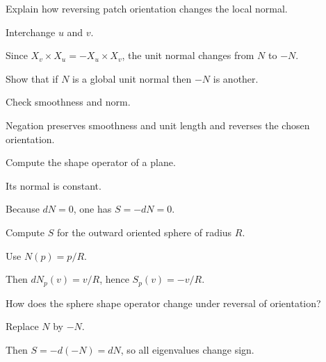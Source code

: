 \begin{exercise}\label{exr:vii16-03}
Explain how reversing patch orientation changes the local normal.
\end{exercise}
\begin{hint}
Interchange \(u\) and \(v\).
\end{hint}
\begin{solution}
Since \(X_v\times X_u=-X_u\times X_v\), the unit normal changes from \(N\) to \(-N\).
\end{solution}

\begin{exercise}\label{exr:vii16-04}
Show that if \(N\) is a global unit normal then \(-N\) is another.
\end{exercise}
\begin{hint}
Check smoothness and norm.
\end{hint}
\begin{solution}
Negation preserves smoothness and unit length and reverses the chosen orientation.
\end{solution}

\begin{exercise}\label{exr:vii16-05}
Compute the shape operator of a plane.
\end{exercise}
\begin{hint}
Its normal is constant.
\end{hint}
\begin{solution}
Because \(dN=0\), one has \(S=-dN=0\).
\end{solution}

\begin{exercise}\label{exr:vii16-06}
Compute \(S\) for the outward oriented sphere of radius \(R\).
\end{exercise}
\begin{hint}
Use \(N(p)=p/R\).
\end{hint}
\begin{solution}
Then \(dN_p(v)=v/R\), hence \(S_p(v)=-v/R\).
\end{solution}

\begin{exercise}\label{exr:vii16-07}
How does the sphere shape operator change under reversal of orientation?
\end{exercise}
\begin{hint}
Replace \(N\) by \(-N\).
\end{hint}
\begin{solution}
Then \(S=-d(-N)=dN\), so all eigenvalues change sign.
\end{solution}

